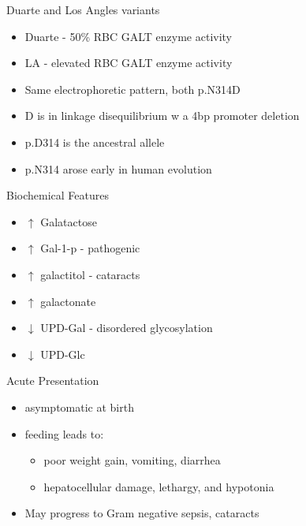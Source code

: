 \documentclass[presentation, smaller]{beamer}
\begin{document}
\begin{frame}[label={sec:org59e10e5}]{Duarte and Los Angles variants}
\begin{itemize}
\item Duarte - 50\% RBC GALT enzyme activity
\item LA - elevated RBC GALT enzyme activity
\item Same electrophoretic pattern, both p.N314D
\item D is in linkage disequilibrium w a 4bp promoter deletion
\item p.D314 is the ancestral allele
\item p.N314 arose early in human evolution
\end{itemize}
\end{frame}


\begin{frame}[label={sec:org3c84768}]{Biochemical Features}
\begin{itemize}
\item \(\uparrow\)  Galatactose
\item \(\uparrow\) Gal-1-p - pathogenic
\item \(\uparrow\)  galactitol - cataracts
\item \(\uparrow\) galactonate
\item \(\downarrow\) UPD-Gal - disordered glycosylation
\item \(\downarrow\) UPD-Glc
\end{itemize}
\end{frame}

\begin{frame}[label={sec:org31c5123}]{Acute Presentation}
\begin{itemize}
\item asymptomatic at birth
\item feeding leads to:
\begin{itemize}
\item poor weight gain, vomiting, diarrhea
\item hepatocellular damage, lethargy, and hypotonia
\end{itemize}
\item May progress to Gram negative sepsis, cataracts
\end{itemize}
\end{frame}
\end{document}
